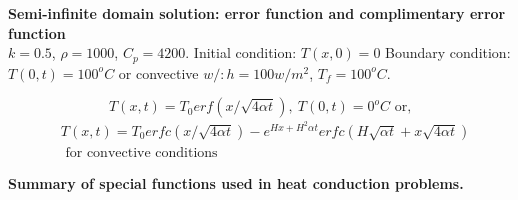 \begin{example}
\textbf{Semi-infinite domain solution: error function and complimentary error
function}\\
$k = 0.5$, $\rho= 1000$, $C_p = 4200$.
Initial condition: $T(x,0)=0$
Boundary condition: $T(0,t)=100^oC$ or convective $w/:h=100w/m^2$, $T_f=100^oC$.


$$T(x,t)=T_0 erf(x/\sqrt{4\alpha t}),~T(0,t)=0^o C\text{ or,}$$
\begin{eqnarray*}
&T(x,t)=T_0 erfc(x/\sqrt{4\alpha t})-e^{Hx+H^2\alpha t}
erfc(H \sqrt{\alpha t}+x\sqrt{4\alpha t})\\
&\text{ for convective conditions}
\end{eqnarray*}
\end{example}

\begin{example}
\textbf{Summary of special functions used in heat conduction problems.}
\end{example}

%
